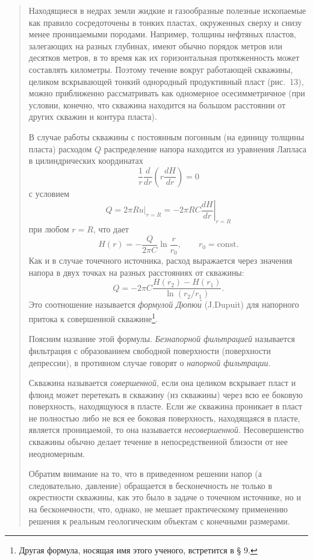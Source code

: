 \documentclass[12pt,a4paper]{article}
\newenvironment{textquote}{\begin{quote}\sloppy}{\end{quote}}
\begin{document}
\begin{textquote}
Находящиеся в недрах земли жидкие и газообразные полезные ископаемые как правило сосредоточены в тонких пластах, окруженных сверху и снизу менее проницаемыми породами. Например, толщины нефтяных пластов, залегающих на разных глубинах, имеют обычно порядок метров или десятков метров, в то время как их горизонтальная протяженность может составлять километры. Поэтому течение вокруг работающей скважины, целиком вскрывающей тонкий однородный продуктивный пласт (рис.~13), можно приближенно рассматривать как одномерное осесимметричное (при условии, конечно, что скважина находится на большом расстоянии от других скважин и контура пласта).


В случае работы скважины с постоянным погонным (на единицу толщины пласта) расходом $Q$ распределение напора находится из уравнения Лапласа в цилиндрических координатах
\[
\frac{1}{r}\frac{d}{dr}\left(r\frac{dH}{dr}\right)=0
\]
с условием
\[
Q=2\pi R\left.u\right|_{r=R}=-\left.2\pi RC\frac{dH}{dr}\right|_{r=R}
\]
при любом $r=R$, что дает
\[
H(r)=-\frac{Q}{2\pi C}\ln\frac{r}{r_0},\qquad r_0=\mathrm{const}.
\]
Как и в случае точечного источника, расход выражается через значения напора в двух точках на разных расстояниях от скважины:
\begin{equation}
Q=-2\pi C\frac{H(r_2)-H(r_1)}{\ln(r_2/r_1)}.
\tag{7.5}\label{q4:eq-7-5}
\end{equation}
Это соотношение называется \textit{формулой Дюпю\'и} (J.Dupuit) для напорного притока к совершенной скважине\footnote[1]{Другая формула, носящая имя этого ученого, встретится в § 9.}.

Поясним название этой формулы. \textit{Безнапорной фильтрацией} называется фильтрация с образованием свободной поверхности (поверхности депрессии), в противном случае говорят о \textit{напорной фильтрации}.

Скважина называется \textit{совершенной}, если она целиком вскрывает пласт и флюид может перетекать в скважину (из скважины) через всю ее боковую поверхность, находящуюся в пласте. Если же скважина проникает в пласт не полностью либо не вся ее боковая поверхность, находящаяся в пласте, является проницаемой, то она называется \textit{несовершенной}. Несовершенство скважины обычно делает течение в непосредственной близости от нее неодномерным.

Обратим внимание на то, что в приведенном решении напор (а следовательно, давление) обращается в бесконечность не только в окрестности скважины, как это было в задаче о точечном источнике, но и на бесконечности, что, однако, не мешает практическому применению решения к реальным геологическим объектам с конечными размерами.
\end{textquote}
\endgroup
\end{document}
